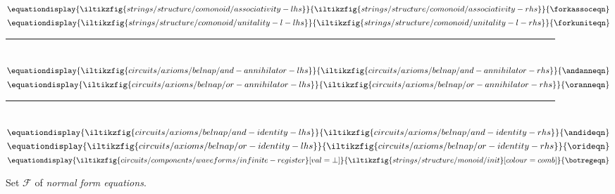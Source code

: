 \begin{figure*}
{    }{\forkcommeqn}\)
    \quad
    \(\equationdisplay{
        \iltikzfig{strings/structure/comonoid/associativity-lhs}
    }{
        \iltikzfig{strings/structure/comonoid/associativity-rhs}
    }{\forkassoceqn}\)
    \quad
    \(\equationdisplay{
        \iltikzfig{strings/structure/comonoid/unitality-l-lhs}
    }{
        \iltikzfig{strings/structure/comonoid/unitality-l-rhs}
    }{\forkuniteqn}\)
    \\[0.25em]
    \rule{\textwidth}{0.1mm}
    \\[0.7em]
    \(\equationdisplay{
        \iltikzfig{circuits/axioms/belnap/and-annihilator-lhs}
    }{
        \iltikzfig{circuits/axioms/belnap/and-annihilator-rhs}
    }{\andanneqn}\)
    \quad
    \(\equationdisplay{
        \iltikzfig{circuits/axioms/belnap/or-annihilator-lhs}
    }{
        \iltikzfig{circuits/axioms/belnap/or-annihilator-rhs}
    }{\oranneqn}\)
    \\[0.25em]
    \rule{\textwidth}{0.1mm}
    \\[0.5em]
    \(\equationdisplay{
        \iltikzfig{circuits/axioms/belnap/and-identity-lhs}
    }{
        \iltikzfig{circuits/axioms/belnap/and-identity-rhs}
    }{\andideqn}\)
    \quad
    \(\equationdisplay{
        \iltikzfig{circuits/axioms/belnap/or-identity-lhs}
    }{
        \iltikzfig{circuits/axioms/belnap/or-identity-rhs}
    }{\orideqn}\)
    \quad
    \(\equationdisplay{
        \iltikzfig{circuits/components/waveforms/infinite-register}[val=\bot]
    }{
        \iltikzfig{strings/structure/monoid/init}[colour=comb]
    }{\botregeqn}\)
    \caption{
        Set \(\mathcal{F}\) of \emph{normal form equations}.
    }
    \label{fig:normal-form-equations}
\end{figure*}

